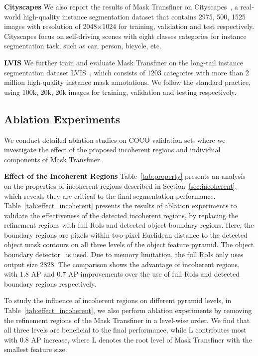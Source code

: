 \documentclass[10pt,twocolumn,letterpaper]{article}
\newcommand{\parsection}[1]{\vspace{1mm}\noindent\textbf{#1}}
\begin{document}
\parsection{Cityscapes} We also report the results of Mask Transfiner on Cityscapes~\cite{cordts2016cityscapes}, a real-world high-quality instance segmentation dataset that contains 2975, 500, 1525 images with resolution of 2048×1024 for training, validation and test respectively. Cityscapes focus on self-driving scenes with eight classes categories for instance segmentation task, such as car, person, bicycle, etc.

\parsection{LVIS} We further train and evaluate Mask Transfiner on the long-tail instance segmentation dataset LVIS~\cite{gupta2019lvis}, which consists of 1203 categories with more than 2 million high-quality instance mask annotations. We follow the standard practice, using 100k, 20k, 20k images for training, validation and testing respectively.


\subsection{Ablation Experiments}

We conduct detailed ablation studies on COCO validation set, where we investigate the effect of the proposed incoherent regions and individual components of Mask Transfiner.

\parsection{Effect of the Incoherent Regions} 
Table~\ref{tab:property} presents
an analysis on the properties of incoherent regions described in Section~\ref{sec:incoherent},  which reveals they are critical to the final segmentation performance.  Table~\ref{tab:effect_incoherent} presents the results of ablation experiments to validate the effectiveness of the detected incoherent regions, by replacing the refinement regions with full RoIs and detected object boundary regions. Here, the boundary regions are pixels within two-pixel Euclidean distance to the detected object mask contours on all three levels of the object feature pyramid. The object boundary detector~\cite{ke2021bcnet} is used. Due to  memory limitation, the full RoIs only uses output size 2828. The comparison shows the advantage of incoherent regions, with 1.8 AP and 0.7 AP improvements over the use of full RoIs and detected boundary regions respectively.

To study the influence of incoherent regions on different pyramid levels, in Table~\ref{tab:effect_incoherent}, we also perform ablation experiments by removing the refinement regions of the Mask Transfiner in a level-wise order. We find that all three levels are beneficial to the final performance, while L contributes most with 0.8 AP increase, where L denotes the root level of Mask Transfiner with the smallest feature size.
\end{document}
